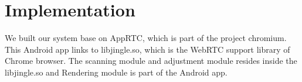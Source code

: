 \section{Implementation}
\label{sec:implementation}

We built our system base on AppRTC, which is part of the project
chromium. This Android app links to libjingle.so, which is the WebRTC
support library of Chrome browser. The scanning module and adjustment
module resides inside the libjingle.so and Rendering module is part of
the Android app.












